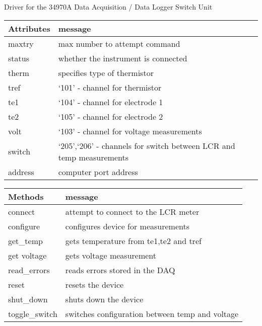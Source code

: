 \documentclass[letterpaper,10pt,english]{sphinxmanual}
\begin{document}
\begin{fulllineitems}
\label{\detokenize{drivers:drivers.DAQ}}
Driver for the 34970A Data Acquisition / Data Logger Switch Unit


\begin{savenotes}\sphinxattablestart
\centering
\begin{tabulary}{\linewidth}[t]{|T|T|}
\hline
\sphinxstyletheadfamily 
Attributes
&\sphinxstyletheadfamily 
message
\\
\hline
maxtry
&
max number to attempt command
\\
\hline
status
&
whether the instrument is connected
\\
\hline
therm
&
specifies type of thermistor
\\
\hline
tref
&
‘101’ - channel for thermistor
\\
\hline
te1
&
‘104’ - channel for electrode 1
\\
\hline
te2
&
‘105’ - channel for electrode 2
\\
\hline
volt
&
‘103’ - channel for voltage measurements
\\
\hline
switch
&
‘205’,‘206’ - channels for switch between LCR and temp measurements
\\
\hline
address
&
computer port address
\\
\hline
\end{tabulary}
\par
\sphinxattableend\end{savenotes}


\begin{savenotes}\sphinxattablestart
\centering
\begin{tabulary}{\linewidth}[t]{|T|T|}
\hline
\sphinxstyletheadfamily 
Methods
&\sphinxstyletheadfamily 
message
\\
\hline
connect
&
attempt to connect to the LCR meter
\\
\hline
configure
&
configures device for measurements
\\
\hline
get\_temp
&
gets temperature from te1,te2 and tref
\\
\hline
get voltage
&
gets voltage measurement
\\
\hline
read\_errors
&
reads errors stored in the DAQ
\\
\hline
reset
&
resets the device
\\
\hline
shut\_down
&
shuts down the device
\\
\hline
toggle\_switch
&
switches configuration between temp and voltage
\\
\hline
\end{tabulary}
\par
\sphinxattableend\end{savenotes}


\end{fulllineitems}
\end{document}
